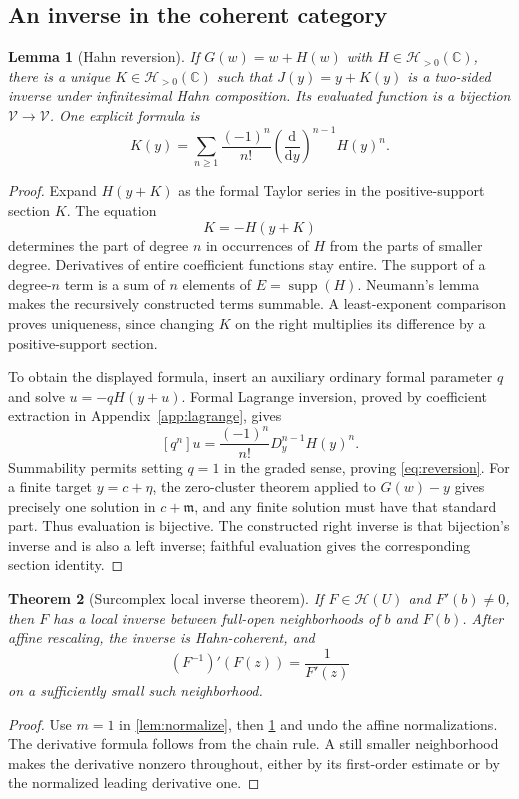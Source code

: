 \documentclass[11pt,oneside]{article}
\numberwithin{equation}{section}
\newtheorem{theorem}{Theorem}[section]
\newtheorem{lemma}[theorem]{Lemma}
\theoremstyle{definition}
\theoremstyle{remark}\newtheorem{remark}[theorem]{Remark}
\newcommand{\C}{\mathbb C}
\newcommand{\HH}{\mathscr H}
\newcommand{\m}{\mathfrak m}
\newcommand{\fin}{\mathcal V}
\newcommand{\supp}{\operatorname{supp}}
\begin{document}
\subsection{An inverse in the coherent category}
\begin{lemma}[Hahn reversion]\label{lem:reversion}
If $G(w)=w+H(w)$ with $H\in\HH_{>0}(\C)$, there is a unique
$K\in\HH_{>0}(\C)$ such that $J(y)=y+K(y)$ is a two-sided inverse
under infinitesimal Hahn composition. Its evaluated function is a
bijection $\fin\to\fin$. One explicit formula is
\begin{equation}\label{eq:reversion}
 K(y)=\sum_{n\geq1}\frac{(-1)^n}{n!}
       \left(\frac{\mathrm d}{\mathrm dy}\right)^{n-1}H(y)^n.
\end{equation}
\end{lemma}
\begin{proof}
Expand $H(y+K)$ as the formal Taylor series in the positive-support
section $K$. The equation
\[
 K=-H(y+K)
\]
determines the part of degree $n$ in occurrences of $H$ from the parts of
smaller degree. Derivatives of entire coefficient functions stay entire.
The support of a degree-$n$ term is a sum of $n$ elements of
$E=\supp(H)$. Neumann's lemma makes the recursively constructed terms
summable. A least-exponent comparison proves uniqueness, since changing
$K$ on the right multiplies its difference by a positive-support section.

To obtain the displayed formula, insert an auxiliary ordinary formal
parameter $q$ and solve $u=-qH(y+u)$. Formal Lagrange inversion, proved by
coefficient extraction in Appendix~\ref{app:lagrange}, gives
\[
 [q^n]u=\frac{(-1)^n}{n!}D_y^{n-1}H(y)^n.
\]
Summability permits setting $q=1$ in the graded sense, proving
\eqref{eq:reversion}.
For a finite target $y=c+\eta$, the zero-cluster theorem applied to
$G(w)-y$ gives precisely one solution in $c+\m$, and any finite solution
must have that standard part. Thus evaluation is bijective. The constructed
right inverse is that bijection's inverse and is also a left inverse;
faithful evaluation gives the corresponding section identity.
\end{proof}

\begin{theorem}[Surcomplex local inverse theorem]\label{thm:inverse}
If $F\in\HH(U)$ and $F'(b)\ne0$, then $F$ has a local inverse between
full-open neighborhoods of $b$ and $F(b)$. After affine rescaling, the
inverse is Hahn-coherent, and
\[
 (F^{-1})'(F(z))=\frac1{F'(z)}
\]
on a sufficiently small such neighborhood.
\end{theorem}
\begin{proof}
Use $m=1$ in \cref{lem:normalize}, then \cref{lem:reversion} and undo
the affine normalizations. The derivative formula follows from the chain
rule. A still smaller neighborhood makes the derivative nonzero
throughout, either by its first-order estimate or by the normalized
leading derivative one.
\end{proof}
\end{document}
